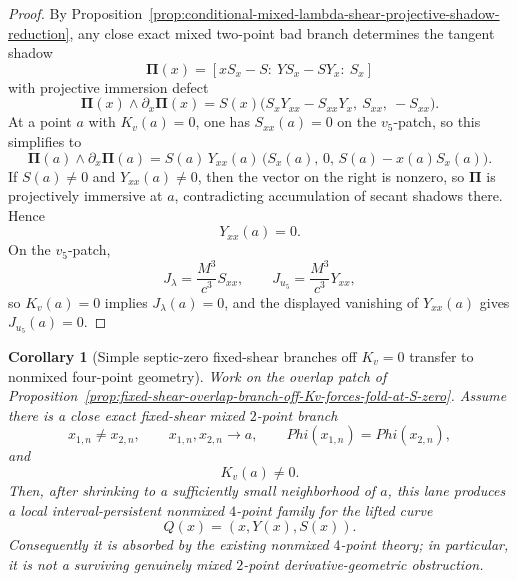 \documentclass[11pt,a4paper]{amsart}
\def\Phi{Phi}%
\theoremstyle{plain}
\newtheorem{corollary}[theorem]{Corollary}
\theoremstyle{definition}
\begin{document}
\begin{proof}
By Proposition~\ref{prop:conditional-mixed-lambda-shear-projective-shadow-reduction},
any close exact mixed two-point bad branch determines the tangent shadow
\[
\mathbf\Pi(x)=[xS_x-S:\ YS_x-SY_x:\ S_x]
\]
with projective immersion defect
\[
\mathbf\Pi(x)\wedge \partial_x\mathbf\Pi(x)
=
S(x)\bigl(S_xY_{xx}-S_{xx}Y_x,\ S_{xx},\ -S_{xx}\bigr).
\]
At a point $a$ with $K_v(a)=0$, one has $S_{xx}(a)=0$ on the $v_5$-patch,
so this simplifies to
\[
\mathbf\Pi(a)\wedge \partial_x\mathbf\Pi(a)
=
S(a)\,Y_{xx}(a)\,\bigl(S_x(a),\,0,\,S(a)-x(a)S_x(a)\bigr).
\]
If $S(a)\neq 0$ and $Y_{xx}(a)\neq 0$, then the vector on the right is
nonzero, so $\mathbf\Pi$ is projectively immersive at $a$, contradicting
accumulation of secant shadows there. Hence
\[
Y_{xx}(a)=0.
\]
On the $v_5$-patch,
\[
J_\lambda=\frac{M^3}{c^3}S_{xx},
\qquad
J_{u_5}=\frac{M^3}{c^3}Y_{xx},
\]
so $K_v(a)=0$ implies $J_\lambda(a)=0$, and the displayed vanishing of
$Y_{xx}(a)$ gives $J_{u_5}(a)=0$.
\end{proof}

\begin{corollary}[Simple septic-zero fixed-shear branches off $K_v=0$ transfer to nonmixed four-point geometry]
\label{cor:fixed-shear-simple-septic-zero-off-Kv-transfers-to-nonmixed-four-point}
Work on the overlap patch of
Proposition~\ref{prop:fixed-shear-overlap-branch-off-Kv-forces-fold-at-S-zero}.
Assume there is a close exact fixed-shear mixed $2$-point branch
\[
x_{1,n}\neq x_{2,n},
\qquad
x_{1,n},x_{2,n}\to a,
\qquad
\Phi(x_{1,n})=\Phi(x_{2,n}),
\]
and
\[
K_v(a)\neq 0.
\]
Then, after shrinking to a sufficiently small neighborhood of $a$, this lane
produces a local interval-persistent nonmixed $4$-point family for the lifted
curve
\[
Q(x)=(x,Y(x),S(x)).
\]
Consequently it is absorbed by the existing nonmixed $4$-point theory;
in particular, it is not a surviving genuinely mixed $2$-point
derivative-geometric obstruction.
\end{corollary}
\end{document}

